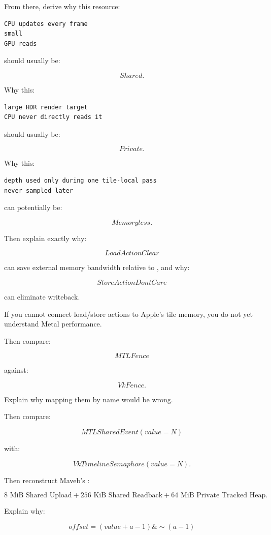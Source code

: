 From there, derive why this resource:

\begin{verbatim}
CPU updates every frame
small
GPU reads
\end{verbatim}

should usually be:

\[
Shared.
\]

Why this:

\begin{verbatim}
large HDR render target
CPU never directly reads it
\end{verbatim}

should usually be:

\[
Private.
\]

Why this:

\begin{verbatim}
depth used only during one tile-local pass
never sampled later
\end{verbatim}

can potentially be:

\[
Memoryless.
\]

Then explain exactly why:

\[
LoadActionClear
\]

can save external memory bandwidth relative to , and why:

\[
StoreActionDontCare
\]

can eliminate writeback.

If you cannot connect load/store actions to Apple's tile memory, you do not yet understand Metal performance.

Then compare:

\[
MTLFence
\]

against:

\[
VkFence.
\]

Explain why mapping them by name would be wrong.

Then compare:

\[
MTLSharedEvent(value=N)
\]

with:

\[
VkTimelineSemaphore(value=N).
\]

Then reconstruct Maveb's :

\[
8\text{ MiB Shared Upload}
+
256\text{ KiB Shared Readback}
+
64\text{ MiB Private Tracked Heap}.
\]

Explain why:

\[
offset=
(value+a-1)\&
\sim(a-1)
\]

